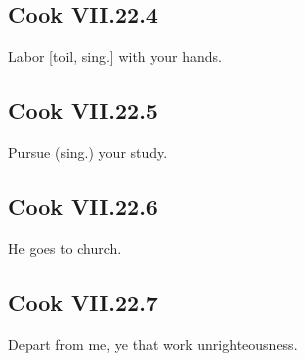 \par\begin{minipage}{\linewidth}\raggedright
\subsection*{Cook VII.22.4}

Labor [toil, sing.] with your hands.

\end{minipage}\par\addvspace{4pt}

\par\begin{minipage}{\linewidth}\raggedright
\subsection*{Cook VII.22.5}

Pursue (sing.) your study.

\end{minipage}\par\addvspace{4pt}

\par\begin{minipage}{\linewidth}\raggedright
\subsection*{Cook VII.22.6}

He goes to church.

\end{minipage}\par\addvspace{4pt}

\par\begin{minipage}{\linewidth}\raggedright
\subsection*{Cook VII.22.7}

Depart from me, ye that work unrighteousness.

\end{minipage}\par\addvspace{4pt}

